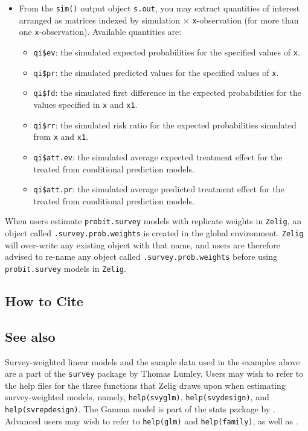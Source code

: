 \begin{itemize}
\item From the {\tt sim()} output object {\tt s.out}, you may extract
  quantities of interest arranged as matrices indexed by simulation
  $\times$ {\tt x}-observation (for more than one {\tt x}-observation).
  Available quantities are:

   \begin{itemize}
   \item {\tt qi\$ev}: the simulated expected probabilities for the
     specified values of {\tt x}.
   \item {\tt qi\$pr}: the simulated predicted values for the
     specified values of {\tt x}.
   \item {\tt qi\$fd}: the simulated first difference in the expected
     probabilities for the values specified in {\tt x} and {\tt x1}.
   \item {\tt qi\$rr}: the simulated risk ratio for the expected
     probabilities simulated from {\tt x} and {\tt x1}.
   \item {\tt qi\$att.ev}: the simulated average expected treatment
     effect for the treated from conditional prediction models.  
   \item {\tt qi\$att.pr}: the simulated average predicted treatment
     effect for the treated from conditional prediction models.  
   \end{itemize}
\end{itemize}

When users estimate {\tt probit.survey} models with replicate weights in {\tt Zelig}, an 
object called {\tt .survey.prob.weights} is created in the global environment.  
{\tt Zelig} will over-write any existing object with that name, and users 
are therefore advised to re-name any object called {\tt .survey.prob.weights} before using {\tt probit.survey} models in {\tt Zelig}.

\subsection* {How to Cite}


 
 
 \subsection* {See also}
 
 Survey-weighted linear models and the sample data used in the
 examples above are a part of the {\tt survey} package by Thomas
 Lumley. Users may wish to refer to the help files for the three
 functions that Zelig draws upon when estimating survey-weighted
 models, namely, {\tt help(svyglm)}, {\tt help(svydesign)}, and {\tt
 help(svrepdesign)}.  The Gamma model is part of the stats package
 by \citet{VenRip02}. Advanced users may wish to refer to
 \texttt{help(glm)} and \texttt{help(family)}, as well as
 \cite{McCNel89}.

